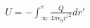 \documentclass[preview]{standalone}
\begin{document}
\begin{align*}
U = - \int_{\infty}^{r} \frac{Q}{4\pi \epsilon_0 r'^2} dr'
\end{align*}
\end{document}
